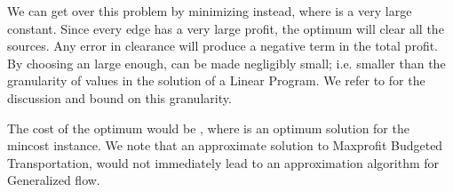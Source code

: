 \documentclass[11pt]{article}
\begin{document}
We can get over this problem by minimizing instead,  where 
is a very large constant. Since every edge has a very large profit, 
the optimum will clear all the sources. Any error  in clearance will
produce a negative term  in the total profit. By choosing
an  large enough,  can be made negligibly small; i.e. smaller
than the granularity of values in the solution of a Linear Program. We refer
to \cite{papadimitriou} for the discussion and bound on this granularity. 

The cost of 
the optimum would be , where  is
an optimum solution for the mincost instance. 
We note that an approximate solution to Maxprofit Budgeted Transportation, would not
immediately lead to an approximation algorithm for Generalized flow.
\end{document}
